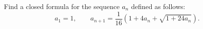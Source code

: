 Find a closed formula for the sequence $a_n$ defined as follows:
\[ a_1 = 1,\qquad a_{n+1} = \frac{1}{16}\left(1 + 4a_n + \sqrt{1 + 24a_n}\right). \]
